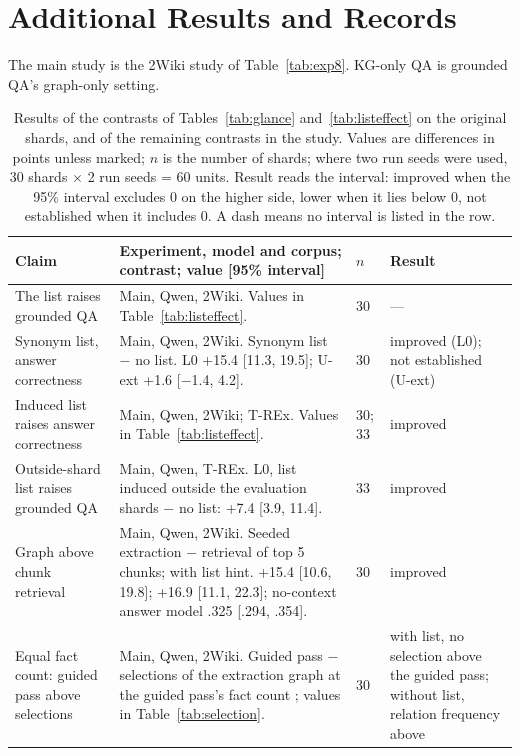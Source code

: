 \renewcommand{\arraystretch}{0.85}\setlength{\textfloatsep}{6pt plus 2pt minus 2pt}\setlength{\dbltextfloatsep}{6pt plus 2pt minus 2pt}\setlength{\floatsep}{6pt plus 1pt minus 1pt}\setlength{\dblfloatsep}{6pt plus 1pt minus 1pt}
\section{Additional Results and Records}
\label{app:experiments}

The main study is the 2Wiki study of Table~\ref{tab:exp8}. KG-only QA is grounded QA's graph-only setting.

\begin{table}[!t]
\centering
\caption{Results of the contrasts of Tables~\ref{tab:glance} and~\ref{tab:listeffect} on the original shards, and of the remaining contrasts in the study. Values are differences in points unless marked; $n$ is the number of shards; where two run seeds were used, 30 shards $\times$ 2 run seeds = 60 units. Result reads the interval: improved when the 95\% interval excludes 0 on the higher side, lower when it lies below 0, not established when it includes 0. A dash means no interval is listed in the row.}
\label{tab:glanceall}
\scriptsize\setlength{\tabcolsep}{2pt}
\begin{tabular}{P{3.5cm}P{9.4cm}P{0.8cm}P{3.9cm}}
\toprule
Claim & Experiment, model and corpus; contrast; value [95\% interval] & $n$ & Result \\
\midrule
The list raises grounded QA & Main, Qwen, 2Wiki. Values in Table~\ref{tab:listeffect}. & 30 & --- \\
Synonym list, answer correctness & Main, Qwen, 2Wiki. Synonym list $-$ no list. L0 +15.4 [11.3, 19.5]; U-ext +1.6 [$-$1.4, 4.2]. & 30 & improved (L0); not established (U-ext) \\
Induced list raises answer correctness & Main, Qwen, 2Wiki; T-REx. Values in Table~\ref{tab:listeffect}. & 30; 33 & improved \\
Outside-shard list raises grounded QA & Main, Qwen, T-REx. L0, list induced outside the evaluation shards $-$ no list: +7.4 [3.9, 11.4]. & 33 & improved \\
Graph above chunk retrieval & Main, Qwen, 2Wiki. Seeded extraction $-$ retrieval of top 5 chunks; with list hint. +15.4 [10.6, 19.8]; +16.9 [11.1, 22.3]; no-context answer model .325 [.294, .354]. & 30 & improved \\
Equal fact count: guided pass above selections & Main, Qwen, 2Wiki. Guided pass $-$ selections of the extraction graph at the guided pass's fact count ; values in Table~\ref{tab:selection}. & 30 & with list, no selection above the guided pass; without list, relation frequency above \\

\end{tabular}
\end{table}
